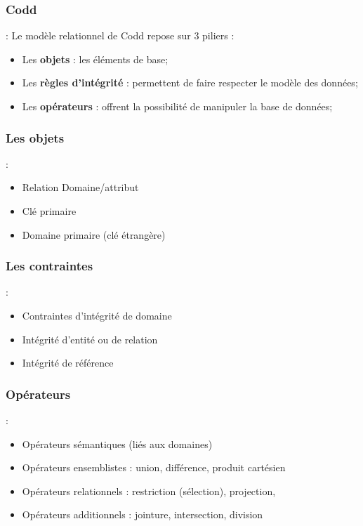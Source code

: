 \documentclass[10pt]{beamer}
\begin{document}
\subsubsection{Codd}
\begin{frame}{\subsecname : \subsubsecname}
    Le modèle relationnel de Codd repose sur 3 piliers :
    \begin{itemize}
        \item Les \textbf{objets}  : les éléments de base;
        \item Les \textbf{règles d’intégrité} : permettent de faire respecter le modèle des données;
        \item Les \textbf{opérateurs} : offrent la possibilité de manipuler la base de données;
    \end{itemize}
\end{frame}

\subsubsection{Les objets}
\begin{frame}{\subsecname : \subsubsecname}
    \begin{itemize}
        \item Relation Domaine/attribut
        \item Clé primaire
        \item Domaine primaire  (clé étrangère)
    \end{itemize}
\end{frame}
\subsubsection{Les contraintes}
\begin{frame}{\subsecname : \subsubsecname}
    \begin{itemize}
        \item Contraintes d'intégrité de domaine
        \item Intégrité d’entité ou de relation
        \item Intégrité de référence
    \end{itemize}
\end{frame}
\subsubsection{Opérateurs}
\begin{frame}{\subsecname : \subsubsecname}
    \begin{itemize}
        \item Opérateurs sémantiques (liés aux domaines)
        \item Opérateurs ensemblistes : union, différence, produit cartésien
        \item Opérateurs relationnels : restriction (sélection), projection,
        \item Opérateurs additionnels : jointure, intersection, division
    \end{itemize}
\end{frame}
\end{document}
